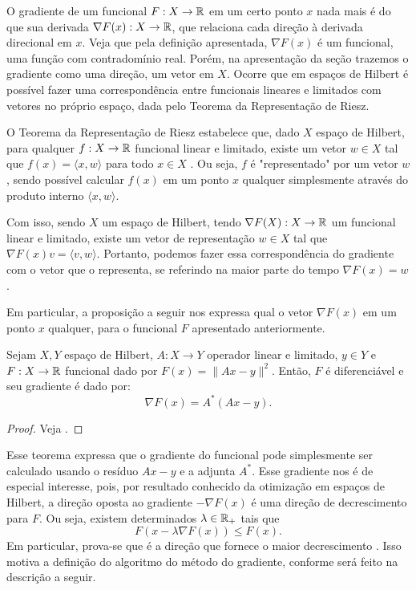 O gradiente de um funcional $F: X \to \mathbb{R}$ em um certo ponto $x$ nada mais é do que sua derivada $\nabla F(x):X \to \mathbb{R}$, que relaciona cada direção à derivada direcional em $x$. Veja que pela definição apresentada, $\nabla F(x)$ é um funcional, uma função com contradomínio real. Porém, na apresentação da seção trazemos o gradiente como uma direção, um vetor em $X$. Ocorre que em espaços de Hilbert é possível fazer uma correspondência entre funcionais lineares e limitados com vetores no próprio espaço, dada pelo Teorema da Representação de Riesz.

O Teorema da Representação de Riesz estabelece que, dado $X$ espaço de Hilbert, para qualquer $f: X\to \mathbb{R}$ funcional linear e limitado, existe um vetor $w\in X$ tal que $f(x) = \langle x, w \rangle$ para todo $x\in X$ \cite{kreyszig}. Ou seja, $f$ é "representado" por um vetor $w$, sendo possível calcular $f(x)$ em um ponto $x$ qualquer simplesmente através do produto interno $\langle x , w \rangle$. 

Com isso, sendo $X$ um espaço de Hilbert, tendo $\nabla F(X): X \to \mathbb{R}$ um funcional linear e limitado, existe um vetor de representação $w \in X$ tal que $\nabla F(x)v = \langle v, w \rangle$. Portanto, podemos fazer essa correspondência do gradiente com o vetor que o representa, se referindo na maior parte do tempo $\nabla F(x) = w$.

Em particular, a proposição a seguir nos expressa qual o vetor $\nabla F(x)$ em um ponto $x$ qualquer, para o funcional $F$ apresentado anteriormente. 

\begin{prop}
    Sejam $X,Y$ espaço de Hilbert, $A:X \to Y$ operador linear e limitado, $y \in Y$ e $F:X \to \mathbb{R}$ funcional dado por $F(x) =  \|Ax-y\|^2$. Então, $F$ é diferenciável e seu gradiente é dado por:
    \[
        \nabla F(x) = A^*(Ax - y).
    \]
\end{prop}
\begin{proof}
    Veja \cite{??}.
\end{proof}

Esse teorema expressa que o gradiente do funcional pode simplesmente ser calculado usando o resíduo $Ax-y$ e a adjunta $A^*$. Esse gradiente nos é de especial interesse, pois, por resultado conhecido da otimização em espaços de Hilbert, a direção oposta ao gradiente $-\nabla F(x)$ é uma direção de decrescimento para $F$. Ou seja, existem determinados $\lambda\in \mathbb{R}_+$ tais que
\[
F(x - \lambda \nabla F(x)) \leq F(x).
\]
Em particular, prova-se que é a direção que fornece o maior decrescimento \cite{??}. Isso motiva a definição do algoritmo do método do gradiente, conforme será feito na descrição a seguir.

